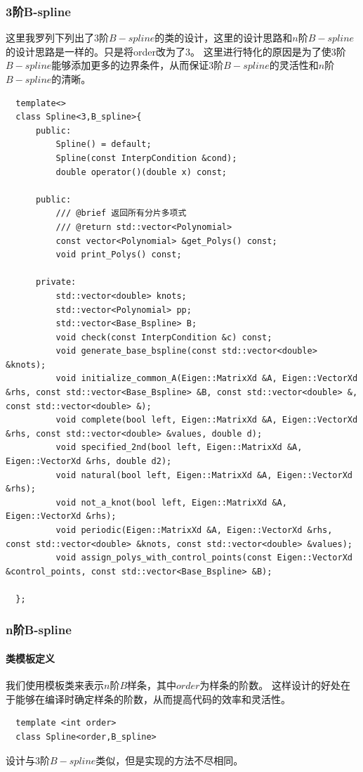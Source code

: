 \documentclass[a4paper]{article}
\begin{document}
\subsubsection*{\textbf{3阶B-spline}}
这里我罗列下列出了$3$阶$B-spline$的类的设计，这里的设计思路和$n$阶$B-spline$的设计思路是一样的。只是将order改为了$3$。
这里进行特化的原因是为了使$3$阶$B-spline$能够添加更多的边界条件，从而保证$3$阶$B-spline$的灵活性和$n$阶$B-spline$的清晰。
\begin{lstlisting}
  template<>
  class Spline<3,B_spline>{
      public:
          Spline() = default;
          Spline(const InterpCondition &cond);
          double operator()(double x) const;
      
      public:
          /// @brief 返回所有分片多项式
          /// @return std::vector<Polynomial>
          const vector<Polynomial> &get_Polys() const;
          void print_Polys() const;

      private:
          std::vector<double> knots;
          std::vector<Polynomial> pp;
          std::vector<Base_Bspline> B;
          void check(const InterpCondition &c) const;
          void generate_base_bspline(const std::vector<double> &knots);
          void initialize_common_A(Eigen::MatrixXd &A, Eigen::VectorXd &rhs, const std::vector<Base_Bspline> &B, const std::vector<double> &, const std::vector<double> &);
          void complete(bool left, Eigen::MatrixXd &A, Eigen::VectorXd &rhs, const std::vector<double> &values, double d);
          void specified_2nd(bool left, Eigen::MatrixXd &A, Eigen::VectorXd &rhs, double d2);
          void natural(bool left, Eigen::MatrixXd &A, Eigen::VectorXd &rhs);
          void not_a_knot(bool left, Eigen::MatrixXd &A, Eigen::VectorXd &rhs);
          void periodic(Eigen::MatrixXd &A, Eigen::VectorXd &rhs, const std::vector<double> &knots, const std::vector<double> &values);
          void assign_polys_with_control_points(const Eigen::VectorXd &control_points, const std::vector<Base_Bspline> &B);

  };
\end{lstlisting}

\subsubsection*{\textbf{n阶B-spline}}
\paragraph{类模板定义}
    我们使用模板类来表示$n$阶$B$样条，其中$order$为样条的阶数。
    这样设计的好处在于能够在编译时确定样条的阶数，从而提高代码的效率和灵活性。
\begin{lstlisting}
  template <int order>
  class Spline<order,B_spline> 
\end{lstlisting}
设计与$3$阶$B-spline$类似，但是实现的方法不尽相同。
\end{document}
